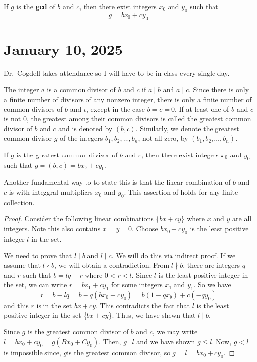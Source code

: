 \documentclass[11pt]{article}
\begin{document}
\begin{theorem}
    If $g$ is the \textbf{gcd} of \( b \) and \( c \), then there exist integers \( x_0 \) and \( y_0 \) such that \[g = bx_0 + cy_0\]
\end{theorem}

\section{January 10, 2025}
Dr.\ Cogdell takes attendance so I will have to be in class every single day.

\begin{definition}
    The integer $a$ is a common divisor of $b$ and $c$ if $a \mid b$ and $a \mid c$. Since there is only a finite number of divisors of any nonzero integer, there is only a finite number of common divisors of $b$ and $c$, except in the case $b = c = 0$. If at least one of $b$ and $c$ is not $0$, the greatest among their common divisors is called the greatest common divisor of $b$ and $c$ and is denoted by $(b, c)$. Similarly, we denote the greatest common divisor $g$ of the integers $b_1, b_2, \ldots, b_n$, not all zero, by $(b_1, b_2, \ldots, b_n)$.
\end{definition}

\begin{theorem}
    If $g$ is the greatest common divisor of $b$ and $c$, then there exist integers $x_0$ and $y_0$ such that $g = (b, c) = bx_0 + cy_0$.
\end{theorem}

\begin{fact}
    Another fundamental way to to state this is that the linear combination of \( b \) and \( c \) is with integgral multipliers \( x_0 \) and \( y_0 \). This assertion of holds for any finite collection.
\end{fact}
\begin{proof}
    Consider the following linear combinations \{\(bx + cy\)\} where \(x\) and \(y\) are all integers. Note this also contains \(x = y = 0\). Choose \(bx_0 + cy_0 \) is the least positive integer \(l\) in the set.

    We need to prove that \(l \mid b\) and \(l \mid c\). We will do this via
    indirect proof. If we assume that \(l \nmid b\), we will obtain a
    contradiction. From \(l \nmid b\), there are integers \(q\) and \(r\) such that
    \(b = lq + r\) where \(0 < r < l\). Since \(l\) is the least positive integer
    in the set, we can write \(r = bx_1 + cy_1\) for some integers \(x_1\) and
    \(y_1\). So we have \[r = b - lq = b - q(bx_0 - cy_0) = b(1 - qx_0) + c(-qy_0)\]  and this \(r\) is in the set {\(bx + cy\)}. This contradicts the fact that
    \(l\) is the least positive integer in the set \{\(bx + cy\)\}. Thus, we have
    shown that \(l \mid b\).

    Since \(g\) is the greatest common divisor of \(b\) and \(c\), we may write \(l
    = bx_0 + cy_0 = g(Bx_0 + Cy_0)\). Then, \(g \mid l\) and we have shown \(g \leq
    l\). Now, \(g < l\) is impossible since, \(g\)is the greatest common divisor,
    so \(g = l = bx_0 + cy_0\).
\end{proof}
\end{document}
